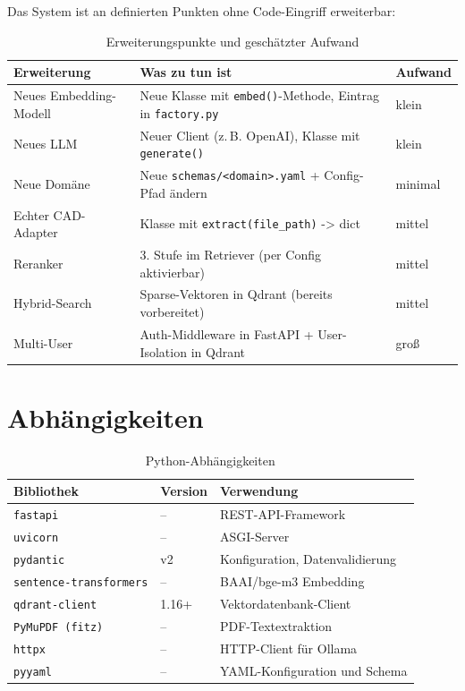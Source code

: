 \documentclass[12pt, a4paper]{article}
\begin{document}
Das System ist an definierten Punkten ohne Code-Eingriff erweiterbar:

\begin{table}[H]
\centering
\small
\begin{tabularx}{\textwidth}{lXl}
\toprule
\textbf{Erweiterung} & \textbf{Was zu tun ist} & \textbf{Aufwand} \\
\midrule
Neues Embedding-Modell & Neue Klasse mit \texttt{embed()}-Methode, Eintrag in \texttt{factory.py} & klein \\
Neues LLM & Neuer Client (z.\,B. OpenAI), Klasse mit \texttt{generate()} & klein \\
Neue Domäne & Neue \texttt{schemas/<domain>.yaml} + Config-Pfad ändern & minimal \\
Echter CAD-Adapter & Klasse mit \texttt{extract(file\_path)} -> dict & mittel \\
Reranker & 3. Stufe im Retriever (per Config aktivierbar) & mittel \\
Hybrid-Search & Sparse-Vektoren in Qdrant (bereits vorbereitet) & mittel \\
Multi-User & Auth-Middleware in FastAPI + User-Isolation in Qdrant & groß \\
\bottomrule
\end{tabularx}
\caption{Erweiterungspunkte und geschätzter Aufwand}
\end{table}

\section{Abhängigkeiten}

\begin{table}[H]
\centering
\small
\begin{tabularx}{\textwidth}{llX}
\toprule
\textbf{Bibliothek} & \textbf{Version} & \textbf{Verwendung} \\
\midrule
\texttt{fastapi} & -- & REST-API-Framework \\
\texttt{uvicorn} & -- & ASGI-Server \\
\texttt{pydantic} & v2 & Konfiguration, Datenvalidierung \\
\texttt{sentence-transformers} & -- & BAAI/bge-m3 Embedding \\
\texttt{qdrant-client} & 1.16+ & Vektordatenbank-Client \\
\texttt{PyMuPDF (fitz)} & -- & PDF-Textextraktion \\
\texttt{httpx} & -- & HTTP-Client für Ollama \\
\texttt{pyyaml} & -- & YAML-Konfiguration und Schema \\
\bottomrule
\end{tabularx}
\caption{Python-Abhängigkeiten}
\end{table}
\end{document}
